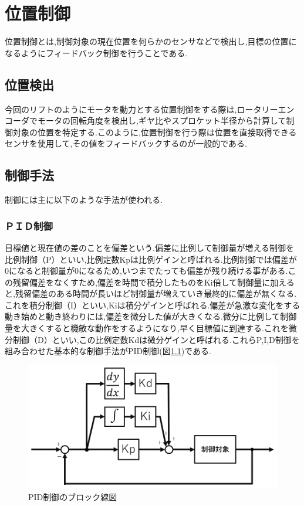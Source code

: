 
\chapter{位置制御}位置制御とは,制御対象の現在位置を何らかのセンサなどで検出し,目標の位置になるようにフィードバック制御を行うことである.

\section{位置検出}今回のリフトのようにモータを動力とする位置制御をする際は,ロータリーエンコーダでモータの回転角度を検出し,ギヤ比やスプロケット半径から計算して制御対象の位置を特定する.このように,位置制御を行う際は位置を直接取得できるセンサを使用して,その値をフィードバックするのが一般的である.

\section{制御手法}
制御には主に以下のような手法が使われる.

\subsection{ＰＩＤ制御}目標値と現在値の差のことを偏差という.偏差に比例して制御量が増える制御を比例制御（P）といい,比例定数Kpは比例ゲインと呼ばれる.比例制御では偏差が0になると制御量が0になるため,いつまでたっても偏差が残り続ける事がある.この残留偏差をなくすため,偏差を時間で積分したものをKi倍して制御量に加えると,残留偏差のある時間が長いほど制御量が増えていき最終的に偏差が無くなる.これを積分制御（I）といい,Kiは積分ゲインと呼ばれる.偏差が急激な変化をする動き始めと動き終わりには,偏差を微分した値が大きくなる.微分に比例して制御量を大きくすると機敏な動作をするようになり,早く目標値に到達する.これを微分制御（D）といい,この比例定数Kdは微分ゲインと呼ばれる.これらP,I,D制御を組み合わせた基本的な制御手法がPID制御(図\ref{fig:PID})である.

\begin{figure}[htbp]
  \begin{center}
    \includegraphics[width=135mm]{img/PID.png}
    \end{center}
  \caption{PID制御のブロック線図}
 \label{fig:PID}
\end{figure}

